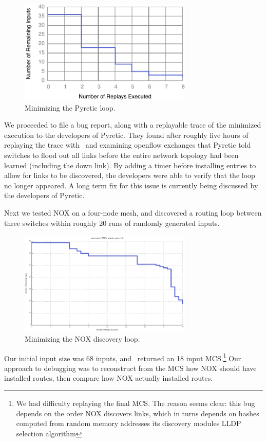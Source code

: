\begin{figure}[t]
    \includegraphics[width=3.25in]{../graphs/runtime/pyretic_loop.pdf}
    \caption[]{\label{fig:pyretic_loop} Minimizing the Pyretic loop.}
\end{figure}

We proceeded to file a bug report, along with a replayable trace of the
minimized execution to the developers of Pyretic. They found after roughly
five hours of replaying the trace with \projectname~and examining openflow exchanges that Pyretic told switches to
flood out all links before the entire
network topology had been learned (including the down link). By adding a timer before installing
entries to allow for links to be discovered, the developers were able to verify
that the loop no longer appeared. A long term fix for this issue is currently being discussed by the developers of
Pyretic.

 Next we tested NOX on a four-node mesh, and discovered a
routing loop between three switches within
roughly 20 runs of randomly generated inputs.

\begin{figure}[t]
    \includegraphics[width=3.25in]{../graphs/runtime/nox_loop.pdf}
    \caption[]{\label{fig:nox_discovery} Minimizing the NOX discovery loop.}
\end{figure}

Our initial input size was 68 inputs, and
\projectname~returned an 18 input MCS.\footnote{\num{We had difficulty
replaying} the final MCS. The reason seems clear: this bug depends on the
order NOX discovers links, which in turns depends on hashes computed from random memory
addresses its discovery modules LLDP selection algorithm}
Our approach to debugging was to
reconstruct from the MCS how NOX should have installed routes, then compare
how NOX actually installed routes.

